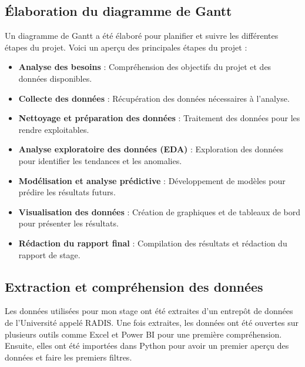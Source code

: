 \subsection{Élaboration du diagramme de Gantt} 
Un diagramme de Gantt a été élaboré pour planifier et suivre les différentes étapes du projet. Voici un aperçu des principales étapes du projet :
\begin{itemize}
    \item \textbf{Analyse des besoins} : Compréhension des objectifs du projet et des données disponibles.
    \item \textbf{Collecte des données} : Récupération des données nécessaires à l'analyse.
    \item \textbf{Nettoyage et préparation des données} : Traitement des données pour les rendre exploitables.
    \item \textbf{Analyse exploratoire des données (EDA)} : Exploration des données pour identifier les tendances et les anomalies.
    \item \textbf{Modélisation et analyse prédictive} : Développement de modèles pour prédire les résultats futurs.
    \item \textbf{Visualisation des données} : Création de graphiques et de tableaux de bord pour présenter les résultats.
    \item \textbf{Rédaction du rapport final} : Compilation des résultats et rédaction du rapport de stage. 
\end{itemize} 

\subsection{Extraction et compréhension des données} 
Les données utilisées pour mon stage ont été extraites d'un entrepôt de données de l'Université appelé RADIS. Une fois extraites, les données ont été ouvertes sur plusieurs outils comme Excel et Power BI pour une première compréhension. Ensuite, elles ont été importées dans Python pour avoir un premier aperçu des données et faire les premiers filtres. 

